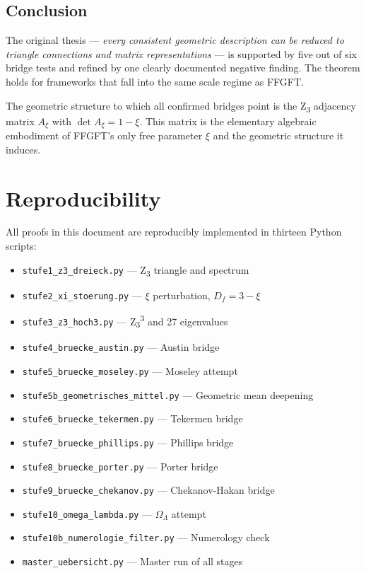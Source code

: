 \subsection{Conclusion}

\begin{conclusionBox}
The original thesis --- \emph{every consistent geometric description can be reduced to triangle connections and matrix representations} --- is supported by five out of six bridge tests and refined by one clearly documented negative finding. The theorem holds for frameworks that fall into the same scale regime as FFGFT.

The geometric structure to which all confirmed bridges point is the Z\textsubscript{3} adjacency matrix \(A_\xi\) with \(\det A_\xi = 1 - \xi\). This matrix is the elementary algebraic embodiment of FFGFT's only free parameter \(\xi\) and the geometric structure it induces.
\end{conclusionBox}

\section*{Reproducibility}

All proofs in this document are reproducibly implemented in thirteen Python scripts:

\begin{itemize}
\item \texttt{stufe1\_z3\_dreieck.py} --- Z\textsubscript{3} triangle and spectrum
\item \texttt{stufe2\_xi\_stoerung.py} --- \(\xi\) perturbation, \(D_f = 3 - \xi\)
\item \texttt{stufe3\_z3\_hoch3.py} --- Z\textsubscript{3}\textsuperscript{3} and 27 eigenvalues
\item \texttt{stufe4\_bruecke\_austin.py} --- Austin bridge
\item \texttt{stufe5\_bruecke\_moseley.py} --- Moseley attempt
\item \texttt{stufe5b\_geometrisches\_mittel.py} --- Geometric mean deepening
\item \texttt{stufe6\_bruecke\_tekermen.py} --- Tekermen bridge
\item \texttt{stufe7\_bruecke\_phillips.py} --- Phillips bridge
\item \texttt{stufe8\_bruecke\_porter.py} --- Porter bridge
\item \texttt{stufe9\_bruecke\_chekanov.py} --- Chekanov-Hakan bridge
\item \texttt{stufe10\_omega\_lambda.py} --- \(\Omega_\Lambda\) attempt
\item \texttt{stufe10b\_numerologie\_filter.py} --- Numerology check
\item \texttt{master\_uebersicht.py} --- Master run of all stages
\end{itemize}

